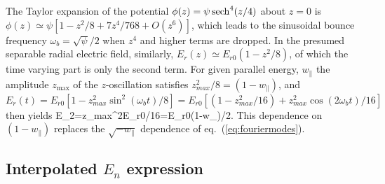 \documentclass{agujournal2019}
\let\oldequation\equation
\let\oldendequation\endequation
\renewenvironment{equation}
  {\linenomathNonumbers\oldequation}
  {\oldendequation\endlinenomath}
\def\wp{w_\parallel}
\begin{document}
The Taylor expansion of the potential
$\phi(z)=\psi\,{\rm sech}^4(z/4)$ about $z=0$ is
$\phi(z)\simeq \psi[1-z^2/8+7z^4/768+O(z^6)]$, which leads to the
sinusoidal bounce frequency $\omega_b=\sqrt{\psi}/2$ when $z^4$ and
higher terms are dropped. In the presumed separable radial electric
field, similarly, $E_r(z)\simeq E_{r0}(1-z^2/8)$, of which the time varying
part is only the second term. For given parallel energy,
$\wp$ the amplitude $z_{\max}$ of the $z$-oscillation satisfies
$z_{max}^2/8=(1-\wp)$, and
$
E_r(t)=E_{r0}[1-z_{max}^2\sin^2(\omega_bt)/8]=E_{r0}[(1-z_{max}^2/16)+z_{max}^2\cos(2\omega_bt)/16]$
then yields
\begin{equation}
  \label{eq:E2}
  E_2=z_{max}^2E_{r0}/16=E_{r0}(1-\wp)/2.
\end{equation}
This dependence on $(1-\wp)$ replaces the
$\sqrt{-\wp}$ dependence of eq.\
(\ref{eq:fouriermodes}). 

\subsection{Interpolated $E_n$ expression}
\end{document}
